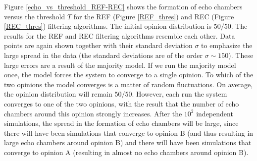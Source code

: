 \documentclass[11 pt , letterpaper , twoside , openright]{book}
\begin{document}
Figure \ref{echo_vs_threshold_REF-REC} shows the formation of echo chambers versus the threshold $T$ for the REF (Figure \ref{REF_thres}) and REC (Figure \ref{REC_thres}) filtering algorithms. The initial opinion distribution is $50/50$. The results for the REF and REC filtering algorithms resemble each other. Data points are again shown together with their standard deviation $\sigma$ to emphasize the large spread in the data (the standard deviations are of the order $\sigma \sim 150$). These large errors are a result of the majority model. If we run the majority model once, the model forces the system to converge to a single opinion. To which of the two opinions the model converges is a matter of random fluctuations. On average, the opinion distribution will remain $50/50$. However, each run the system converges to one of the two opinions, with the result that the number of echo chambers around this opinion strongly increases. After the $10^2$ independent simulations, the spread in the formation of echo chambers will be large, since there will have been simulations that converge to opinion B (and thus resulting in large echo chambers around opinion B) and there will have been simulations that converge to opinion A (resulting in almost no echo chambers around opinion B).
\end{document}
